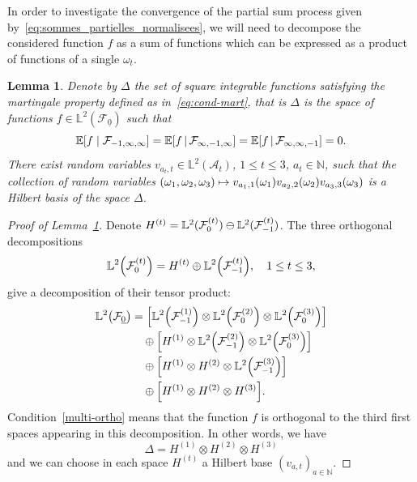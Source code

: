 \documentclass[10pt]{amsart}
\newtheorem{lemm}[theo]{Lemma}\newtheorem{prop}[theo]{Proposition}\newtheorem{coro}[theo]{Corollary}\newtheorem{conj}[theo]{Conjecture}
\theoremstyle{definition}\newtheorem{defi}[theo]{Definition}\newtheorem{rema}[theo]{Remark}\newtheorem{exam}[theo]{Example}\newtheorem{exem}[theo]{Example}\newtheorem{nota}[theo]{Notation}
\newcommand*\N{\mathbb{N}}
\newcommand*\bbL{\mathbb{L}}
\newcommand{\bbE}{\mathbb{E}}
\newcommand{\E}[1]{\bbE\left[#1\right]}
\newcommand*\A{\mathcal{A}}
\newcommand{\Fca}{\mathcal{F}}
\newcommand{\pr}[1]{\left(#1\right)}
\let\originalleft\left
\let\originalright\right
\renewcommand{\left}{\mathopen{}\mathclose\bgroup\originalleft}
\renewcommand{\right}{\aftergroup\egroup\originalright}
\begin{document}
In order to investigate the convergence of the partial sum process given by~\eqref{eq:sommes_partielles_normalisees}, we will need to decompose the considered function $f$ as a sum of functions which can be expressed as a product of functions of a single $\omega_t$.
\begin{lemm}\label{lem:base_Hilbert}
Denote by $\Delta$ the set of square integrable functions satisfying the martingale property defined as in~\eqref{eq:cond-mart}, {that is $\Delta$ is the space of functions $f\in \bbL^2(\Fca_{\underline0})$ such that
\begin{equation}\label{multi-ortho}
\E{f\mid\Fca_{-1,\infty,\infty}}=\E{f\,\middle|\,\Fca_{\infty,-1,\infty}}=\E{f\,\middle|\,\Fca_{\infty,\infty,-1}}=0.
\end{equation}
There exist random variables $v_{a_t,t}\in \bbL^2(\A_t)$, $1\leq t\leq 3$, $a_t\in\N$, such that the collection of random variables $(\omega_1,\omega_2,\omega_3)\mapsto v_{a_1,1}\pr{\omega_1}v_{a_2,2}\pr{\omega_2} v_{a_3,3}\pr{\omega_3}$ is a Hilbert basis of the space $\Delta$.}
\end{lemm}
\begin{proof}[Proof of Lemma~\ref{lem:base_Hilbert}]
Denote $H^{(t)}=\bbL^2(\Fca_{0}^{\pr{t}})\ominus
\bbL^2(\Fca_{-1}^{\pr{t}})$.
The three orthogonal decompositions
\[
\bbL^2\pr{\Fca_{0}^{\pr{t}}}=H^{(t)} \oplus \bbL^2\left(\Fca_{-1}^{\pr{t}}\right), \quad 1\leq t\leq 3,
\]
give a decomposition of their tensor product:
\begin{align*}
\bbL^2\left(\Fca_{\underline0}\right)&=\left[\bbL^2\pr{\Fca_{-1}^{\pr{1}}} \otimes \bbL^2\pr{\Fca_{0}^{\pr{2}}}\otimes \bbL^2\pr{\Fca_{0}^{\pr{3}}}\right]\\
&\quad\oplus\left[H^{(1)}\otimes \bbL^2\pr{\Fca_{-1}^{\pr{2}}}\otimes\bbL^2\pr{\Fca_{0}^{\pr{3}}}\right]\\
&\quad\oplus \left[H^{(1)}\otimes H^{(2)}\otimes \bbL^2\pr{\Fca_{-1}^{\pr{3}}}\right]\\
&\quad\oplus\left[H^{(1)}\otimes H^{(2)}\otimes H^{(3)}\right].
\end{align*}
Condition~\eqref{multi-ortho} means that the function $f$ is orthogonal to the third first spaces appearing in this decomposition. In other words, we have
\[
\Delta=H^{(1)}\otimes H^{(2)}\otimes H^{(3)}
\]
and we can choose in each space $H^{(t)}$ a Hilbert base $(v_{a,t})_{a\in\N}$.
\end{proof}
\end{document}
